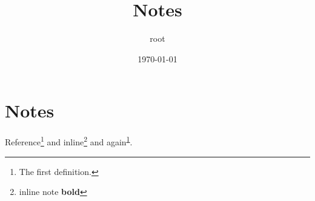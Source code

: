 \documentclass[11pt]{article}
\author{root}
\date{\today}
\title{Notes}
\begin{document}
\maketitle
\tableofcontents

\section{Notes}
\label{sec:orgf9de070}
Reference\footnote{The first definition.\label{orgf949eff}} and inline\footnote{inline note \textbf{bold}} and again\textsuperscript{\ref{orgf949eff}}.
\end{document}

